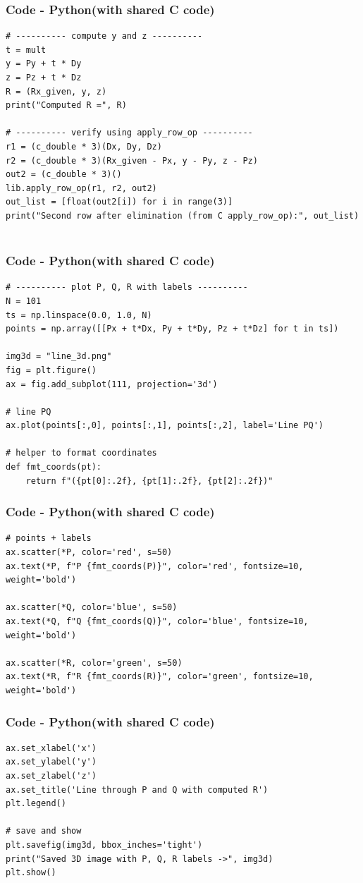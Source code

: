 \documentclass{beamer}
\theoremstyle{remark}
\numberwithin{equation}{section}
\begin{document}
\begin{frame}[fragile]
\frametitle{Code - Python(with shared C code)}
\begin{lstlisting}
# ---------- compute y and z ----------
t = mult
y = Py + t * Dy
z = Pz + t * Dz
R = (Rx_given, y, z)
print("Computed R =", R)

# ---------- verify using apply_row_op ----------
r1 = (c_double * 3)(Dx, Dy, Dz)
r2 = (c_double * 3)(Rx_given - Px, y - Py, z - Pz)
out2 = (c_double * 3)()
lib.apply_row_op(r1, r2, out2)
out_list = [float(out2[i]) for i in range(3)]
print("Second row after elimination (from C apply_row_op):", out_list)


\end{lstlisting}
\end{frame}

\begin{frame}[fragile]
\frametitle{Code - Python(with shared C code)}
\begin{lstlisting}
# ---------- plot P, Q, R with labels ----------
N = 101
ts = np.linspace(0.0, 1.0, N)
points = np.array([[Px + t*Dx, Py + t*Dy, Pz + t*Dz] for t in ts])

img3d = "line_3d.png"
fig = plt.figure()
ax = fig.add_subplot(111, projection='3d')

# line PQ
ax.plot(points[:,0], points[:,1], points[:,2], label='Line PQ')

# helper to format coordinates
def fmt_coords(pt):
    return f"({pt[0]:.2f}, {pt[1]:.2f}, {pt[2]:.2f})"

\end{lstlisting}
\end{frame}

\begin{frame}[fragile]
\frametitle{Code - Python(with shared C code)}
\begin{lstlisting}
# points + labels
ax.scatter(*P, color='red', s=50)
ax.text(*P, f"P {fmt_coords(P)}", color='red', fontsize=10, weight='bold')

ax.scatter(*Q, color='blue', s=50)
ax.text(*Q, f"Q {fmt_coords(Q)}", color='blue', fontsize=10, weight='bold')

ax.scatter(*R, color='green', s=50)
ax.text(*R, f"R {fmt_coords(R)}", color='green', fontsize=10, weight='bold')

\end{lstlisting}
\end{frame}

\begin{frame}[fragile]
\frametitle{Code - Python(with shared C code)}
\begin{lstlisting}
ax.set_xlabel('x')
ax.set_ylabel('y')
ax.set_zlabel('z')
ax.set_title('Line through P and Q with computed R')
plt.legend()

# save and show
plt.savefig(img3d, bbox_inches='tight')
print("Saved 3D image with P, Q, R labels ->", img3d)
plt.show()

\end{lstlisting}
\end{frame}
\end{document}

